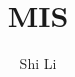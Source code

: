 \documentclass[12pt]{article}
\begin{document}
\title{MIS}
\author{Shi Li}
\date{}
\maketitle



\newpage
\printbibliography
\end{document}

